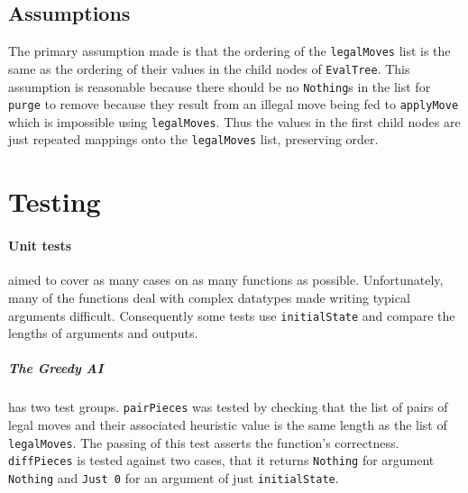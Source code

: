 \documentclass[11pt]{article}
\begin{document}
 \subsection*{Assumptions}%
The primary assumption made is that the ordering of the \verb|legalMoves| list is the same as the ordering of their values in the child nodes of \verb|EvalTree|. This assumption is reasonable because there should be no \verb|Nothing|s in the list for \verb|purge| to remove because they result from an illegal move being fed to \verb|applyMove| which is impossible using \verb|legalMoves|. Thus the values in the first child nodes are just repeated mappings onto the \verb|legalMoves| list, preserving order. %

\newpage
\section{Testing}%
\paragraph{Unit tests} aimed to cover as many cases on as many functions as possible. Unfortunately, many of the functions deal with complex datatypes made writing typical arguments difficult. Consequently some tests use \verb|initialState| and compare the lengths of arguments and outputs.

\subparagraph{The Greedy AI} has two test groups. \verb|pairPieces| was tested by checking that the list of pairs of legal moves and their associated heuristic value is the same length as the list of \verb|legalMoves|. The passing of this test asserts the function's correctness. \verb|diffPieces| is tested against two cases, that it returns \verb|Nothing| for argument \verb|Nothing| and \verb|Just 0| for an argument of just \verb|initialState|.
\end{document}
